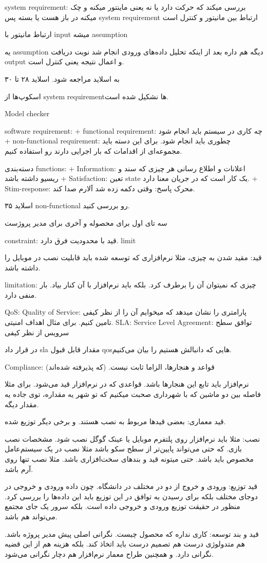 system requirement:
بررسی میکند که حرکت دارد یا نه یعنی ماینتور میکنه و چک میکنه در باز هست یا بسته
پس system requirement ارتباط بین مانیتور و کنترل است

ارتباط مانیتور با input میشه assumption

یه assumption دیگه هم داره بعد از اینکه تحلیل داده‌های ورودی انجام شد نوبت
دریافت output و اعمال نتیجه یعنی کنترل است.

به اسلاید مراجعه شود. اسلاید ۲۸ تا ۳۰

اسکوپ‌ها از system requirementها نشکیل شده است.


Model checker

software requirement:
+ functional requirement: چه کاری در سیستم باید انجام شود
+ non-functional requirement: چطوری باید انجام شود. برای این دسته باید مجموعه‌ای
از اقدامات که بار اجرایی دارند رو استفاده کنیم.

دسته‌بندی functions:
+ Information: اعلانات و اطلاع رسانی هر چیزی که سند و ریسیو داشته باشد
+ Satisfaction: تعین state یک کار است که در جریان معنا دارد.
+ Stim-response: محرک پاسخ: وقتی دکمه زده شد آلارم صدا کند.

اسلاید ۳۵ non-functional رو بررسی کنید.

سه تای اول برای محصوله
و آخری برای مدیر پروژست

constraint: قید با محدودیت فرق دارد. limit

قید: مقید شدن به چیزی، مثلا نرم‌افزاری که توسعه شده باید قابلیت نصب در موبایل را
داشته باشد.

limitation: چیزی که نمیتوان آن را برطرف کرد. بلکه باید نرم‌افزار با آن کنار
بیاد. بار منفی دارد.

QoS: Quality of Service: پارامتری را نشان میدهد که میخوایم آن را از نظر کیفی
تامین کنیم. برای مثال اهداف امنیتی.
SLA: Service Level Agreement: توافق سطح سرویس از نظر کیفی

در قرار داد sla مقدار قابل قبول qosهایی که دانبالش هستیم را بیان می‌کنیم.

Compliance: قواعد و هنجار‌ها، الزاما ثابت نیست. (که پذیرفته شده‌اند)

نرم‌افزار باید تابع این هنجار‌ها باشد. قواعدی که در نرم‌افزار قید می‌شود. برای
مثلا فاصله بین دو ماشین که با شهرداری صحبت میکنیم که تو شهر یه مقداره، توی جاده
یه مقدار دیگه.

قید معماری: بعضی قید‌ها مربوط به نصب هستند. و برخی دیگر توزیع شده.

نصب: مثلا باید نرم‌افزار روی پلتفرم موبایل یا عینک گوگل نصب شود. مشخصات نصب
بازی. که حتی می‌تواند پایین‌تر از سطح سکو باشد مثلا نصب در یک سیستم‌عامل مخصوص
باید باشد. حتی میتونه قید و بند‌های سخت‌افزاری باشد. مثلا نصب تنها روی آرم باشد.

قید توزیع: ورودی و خروج از دو در مختلف در دانشگاه. چون داده ورودی و خروجی در
دوجای مختلف بلکه برای رسیدن به توافق در این توزیع باید این داده‌ها را بررسی کرد.
منظور در حقیقت توزیع ورودی و خروجی داده است. بلکه سرور یک جای مجتمع می‌تواند هم
باشد.

قید و بند توسعه:
کاری نداره که محصول چیست. نگرانی اصلی پیش مدیر پروژه باشد. هم متدولوژی درست هم
تصمیم درست باید اتخاذ کند. بلکه هزینه هم از این قضیه نگرانی دارد. و همچنین طراح
معمار نرم‌افزار هم دچار نگرانی می‌شود. 